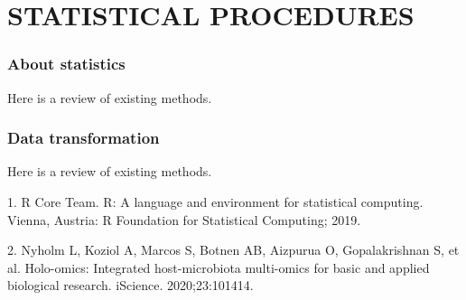 \documentclass[
]{article}
\newlength{\cslhangindent}
\newlength{\cslentryspacingunit} %
\newenvironment{CSLReferences}[2] %
 {%
  \setlength{\parindent}{0pt}
  \ifodd #1
  \let\oldpar\par
  \def\par{\hangindent=\cslhangindent\oldpar}
  \fi
  \setlength{\parskip}{#2\cslentryspacingunit}
 }%
 {}
\begin{document}
\hypertarget{part-statistical-procedures}{%
\part{STATISTICAL PROCEDURES}\label{part-statistical-procedures}}

\hypertarget{about-statistics}{%
\section{About statistics}\label{about-statistics}}

Here is a review of existing methods.

\hypertarget{data-transformation}{%
\section{Data transformation}\label{data-transformation}}

Here is a review of existing methods.

\hypertarget{refs}{}
\begin{CSLReferences}{0}{0}
\leavevmode{}%
1. R Core Team. R: A language and environment for statistical computing. Vienna, Austria: R Foundation for Statistical Computing; 2019.

\leavevmode{}%
2. Nyholm L, Koziol A, Marcos S, Botnen AB, Aizpurua O, Gopalakrishnan S, et al. Holo-omics: Integrated host-microbiota multi-omics for basic and applied biological research. iScience. 2020;23:101414.

\end{CSLReferences}
\end{document}
